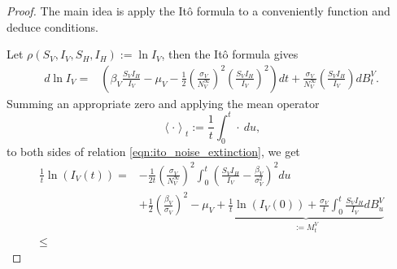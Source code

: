 \begin{proof}
    The main idea is apply the It\^{o} formula to a conveniently function and 
    deduce conditions. 
    
    Let $\rho (S_V, I_V, S_H, I_H) := \ln I_V$, then the It\^{o} 
    formula gives
    \begin{equation} \label{eqn:ito_noise_extinction}
        \begin{aligned}
            d \ln I_V = & 
                \left(
                    \beta_V
                    \frac{S_V I_H}{ I_V} - \mu_V
                    - 
                    \frac{1}{2}
                    \left(
                        \frac{\sigma_V}{N_V^{\infty}}
                    \right) ^ 2
                    \left(
                        \frac{ S_V I_H}{I_V}
                    \right) ^ 2
                \right) dt
                 + 
                \frac{\sigma_V}{N_V^{\infty}}
                \left(
                    \frac{S_V I_H}{ I_V}
                \right) dB_t ^ V.
        \end{aligned}
    \end{equation}
    Summing an appropriate zero and applying the mean operator
    $$
        \left < \cdot \right >_t
        := 
            \frac{1}{t}
            \int_{0} ^ t
                \cdot \ du,
    $$
    to both sides of relation \eqref{eqn:ito_noise_extinction}, we get
    \begin{equation} \label{eqn:applying_mean_opeartor}
        \begin{aligned}
            \frac{1}{t} \ln(I_V(t))
            =&
            -
            \frac{1}{2t}
            \left(
                \frac{\sigma_V }{N_V^{\infty}}
            \right) ^ 2
            \int_{0} ^ {t}
                \left(
                    \frac{S_V I_H}{I_V} 
                    -
                    \frac{\beta_V}{\sigma_V ^ 2}
                \right)^2
            du
            \\
            & 
            + 
            \frac{1}{2}
            \left(
                \frac{\beta_V}{\sigma_V}
            \right) ^ 2
            -
            \mu_V 
            + 
            \underbrace{
                \frac{1}{t} \ln(I_V(0))
                +
                \frac{\sigma_V}{t}
                \int_{0}^t
                    \frac{S_V I_H}{I_V}
                    dB_u^V
            }_{:=M_t ^ V}
            \\
            \leq

\end{aligned}
\end{equation}
\end{proof}

